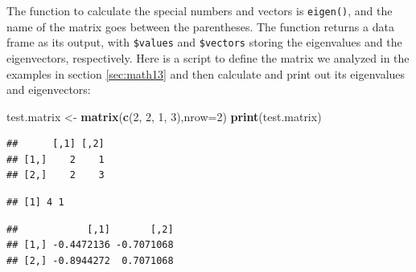 \documentclass[
]{book}
\newenvironment{Shaded}{\begin{snugshade}}{\end{snugshade}}
\newcommand{\DataTypeTok}[1]{\textcolor[rgb]{0.13,0.29,0.53}{#1}}
\newcommand{\DecValTok}[1]{\textcolor[rgb]{0.00,0.00,0.81}{#1}}
\newcommand{\KeywordTok}[1]{\textcolor[rgb]{0.13,0.29,0.53}{\textbf{#1}}}
\newcommand{\NormalTok}[1]{#1}
\newcommand{\OperatorTok}[1]{\textcolor[rgb]{0.81,0.36,0.00}{\textbf{#1}}}
\newcommand{\StringTok}[1]{\textcolor[rgb]{0.31,0.60,0.02}{#1}}
\theoremstyle{definition}
\theoremstyle{definition}
\theoremstyle{definition}
\theoremstyle{remark}
\begin{document}
The function to calculate the special numbers and vectors is \texttt{eigen()}, and the name of the matrix goes between the parentheses. The function returns a data frame as its output, with \texttt{\$values} and \texttt{\$vectors} storing the eigenvalues and the eigenvectors, respectively. Here is a script to define the matrix we analyzed in the examples in section \ref{sec:math13} and then calculate and print out its eigenvalues and eigenvectors:

\begin{Shaded}
\begin{Highlighting}[]
\NormalTok{test.matrix \textless{}{-}}\StringTok{ }\KeywordTok{matrix}\NormalTok{(}\KeywordTok{c}\NormalTok{(}\DecValTok{2}\NormalTok{,  }\DecValTok{2}\NormalTok{, }\DecValTok{1}\NormalTok{, }\DecValTok{3}\NormalTok{),}\DataTypeTok{nrow=}\DecValTok{2}\NormalTok{)}
\KeywordTok{print}\NormalTok{(test.matrix)}
\end{Highlighting}
\end{Shaded}

\begin{verbatim}
##      [,1] [,2]
## [1,]    2    1
## [2,]    2    3
\end{verbatim}

\begin{Shaded}
\end{Shaded}

\begin{verbatim}
## [1] 4 1
\end{verbatim}

\begin{Shaded}
\end{Shaded}

\begin{verbatim}
##            [,1]       [,2]
## [1,] -0.4472136 -0.7071068
## [2,] -0.8944272  0.7071068
\end{verbatim}
\end{document}
